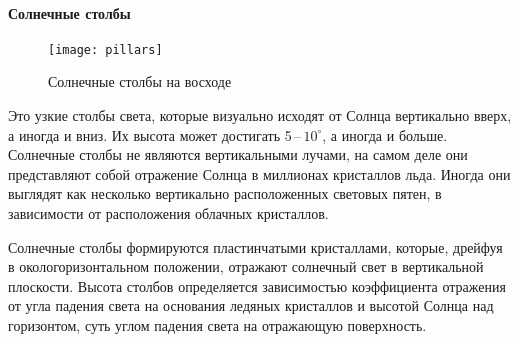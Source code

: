 \paragraph{Солнечные столбы}

\begin{wrapfigure}[10]{r}{0.3\tw} 
    \vspace{-1pc}
    \centering
	\texttt{[image: pillars]}
	\caption{Солнечные столбы на восходе}
	\label{pic:pillars}    
\end{wrapfigure}
Это узкие столбы света, которые визуально исходят от Солнца вертикально вверх, а иногда и вниз. Их высота может достигать 5\,--\,$10^\circ$, а иногда и больше. Солнечные столбы не являются вертикальными лучами, на самом деле они представляют собой отражение Солнца в миллионах кристаллов льда. Иногда они выглядят как несколько вертикально расположенных световых пятен, в зависимости от расположения облачных кристаллов.

Солнечные столбы формируются пластинчатыми кристаллами, которые, дрейфуя в окологоризонтальном положении, отражают солнечный свет в вертикальной плоскости. Высота столбов определяется зависимостью коэффициента отражения от угла падения света на основания ледяных кристаллов и высотой Солнца над горизонтом, суть углом падения света на отражающую поверхность.



